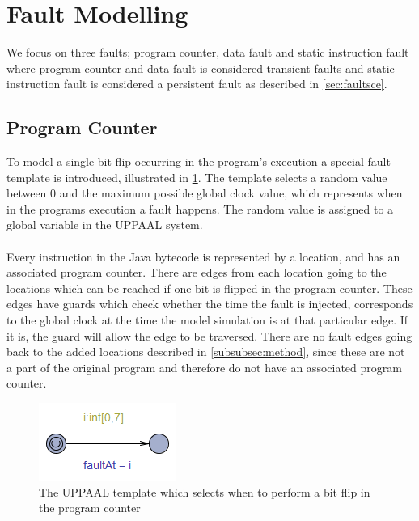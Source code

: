 \section{Fault Modelling}
We focus on three faults; program counter, data fault and static instruction fault where program counter and data fault is considered transient faults and static instruction fault is considered a persistent fault as described in \cref{sec:faultsce}.


\subsection{Program Counter}
To model a single bit flip occurring in the program's execution a special fault template is introduced, illustrated in \cref{fig:faultTime}. The template selects a random value between $0$ and the maximum possible global clock value, which represents when in the programs execution a fault happens. The random value is assigned to a global variable in the UPPAAL system.\\\\
Every instruction in the Java bytecode is represented by a location, and has an associated program counter. There are edges from each location going to the locations which can be reached if one bit is flipped in the program counter. These edges have guards which check whether the time the fault is injected, corresponds to the global clock at the time the model simulation is at that particular edge. If it is, the guard will allow the edge to be traversed. There are no fault edges going back to the added locations described in \cref{subsubsec:method}, since these are not a part of the original program and therefore do not have an associated program counter.
\begin{figure}[H]
\centering
\includegraphics{figures/fault.PNG}
\caption{The UPPAAL template which selects when to perform a bit flip in the program counter}
\label{fig:faultTime}
\end{figure}

